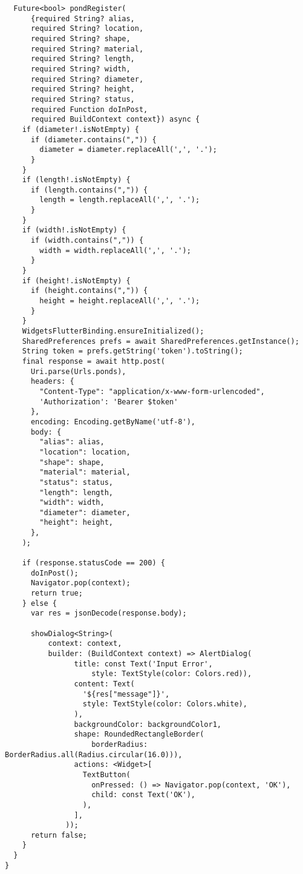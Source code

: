 \begin{lstlisting}
  Future<bool> pondRegister(
      {required String? alias,
      required String? location,
      required String? shape,
      required String? material,
      required String? length,
      required String? width,
      required String? diameter,
      required String? height,
      required String? status,
      required Function doInPost,
      required BuildContext context}) async {
    if (diameter!.isNotEmpty) {
      if (diameter.contains(",")) {
        diameter = diameter.replaceAll(',', '.');
      }
    }
    if (length!.isNotEmpty) {
      if (length.contains(",")) {
        length = length.replaceAll(',', '.');
      }
    }
    if (width!.isNotEmpty) {
      if (width.contains(",")) {
        width = width.replaceAll(',', '.');
      }
    }
    if (height!.isNotEmpty) {
      if (height.contains(",")) {
        height = height.replaceAll(',', '.');
      }
    }
    WidgetsFlutterBinding.ensureInitialized();
    SharedPreferences prefs = await SharedPreferences.getInstance();
    String token = prefs.getString('token').toString();
    final response = await http.post(
      Uri.parse(Urls.ponds),
      headers: {
        "Content-Type": "application/x-www-form-urlencoded",
        'Authorization': 'Bearer $token'
      },
      encoding: Encoding.getByName('utf-8'),
      body: {
        "alias": alias,
        "location": location,
        "shape": shape,
        "material": material,
        "status": status,
        "length": length,
        "width": width,
        "diameter": diameter,
        "height": height,
      },
    );

    if (response.statusCode == 200) {
      doInPost();
      Navigator.pop(context);
      return true;
    } else {
      var res = jsonDecode(response.body);

      showDialog<String>(
          context: context,
          builder: (BuildContext context) => AlertDialog(
                title: const Text('Input Error',
                    style: TextStyle(color: Colors.red)),
                content: Text(
                  '${res["message"]}',
                  style: TextStyle(color: Colors.white),
                ),
                backgroundColor: backgroundColor1,
                shape: RoundedRectangleBorder(
                    borderRadius: BorderRadius.all(Radius.circular(16.0))),
                actions: <Widget>[
                  TextButton(
                    onPressed: () => Navigator.pop(context, 'OK'),
                    child: const Text('OK'),
                  ),
                ],
              ));
      return false;
    }
  }
}
	\end{lstlisting}
	
